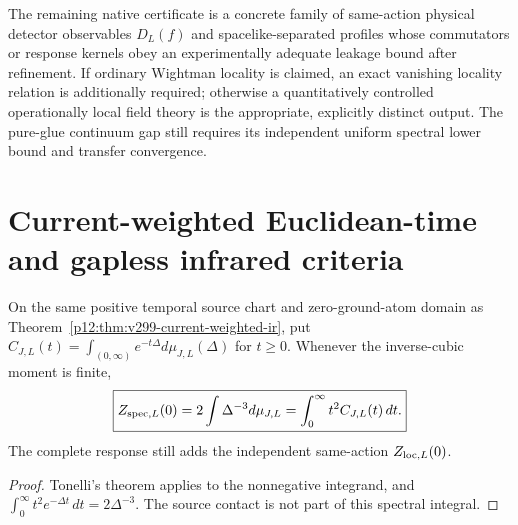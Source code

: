 \documentclass[12pt,a4paper]{article}
\begin{document}
\begin{remark}
\label{p12:rem:v350-operational-locality-frontier}
The remaining native certificate is a concrete family of
same-action physical detector observables $D_L(f)$ and
spacelike-separated profiles whose commutators or response
kernels obey an experimentally adequate leakage bound after
refinement. If ordinary Wightman locality is claimed, an
exact vanishing locality relation is additionally required;
otherwise a quantitatively controlled operationally local
field theory is the appropriate, explicitly distinct output.
The pure-glue continuum gap still requires its independent
uniform spectral lower bound and transfer convergence.
\end{remark}

\section{Current-weighted Euclidean-time and gapless infrared criteria}
\label{p12:sec:v356-gapless-current-control}

\begin{proposition}
\label{p12:prop:v356-current-time-integral}
On the same positive temporal source chart and zero-ground-atom
domain as Theorem~\ref{p12:thm:v299-current-weighted-ir}, put
$C_{J,L}(t)=\int_{(0,\infty)}e^{-t\Delta}
 d\mu_{J,L}(\Delta)$ for $t\ge0$.  Whenever the inverse-cubic
moment is finite,
\[
 \boxed{Z_{{\rm spec},L}(0)=2\int\Delta^{-3}d\mu_{J,L}
 =\int_0^\infty t^2 C_{J,L}(t)\,dt.}
\]
The complete response still adds the independent same-action
$Z_{{\rm loc},L}(0)$.
\end{proposition}
\begin{proof}
Tonelli's theorem applies to the nonnegative integrand, and
$\int_0^\infty t^2e^{-\Delta t}\,dt=2\Delta^{-3}$.
The source contact is not part of this spectral integral.
\end{proof}
\end{document}
